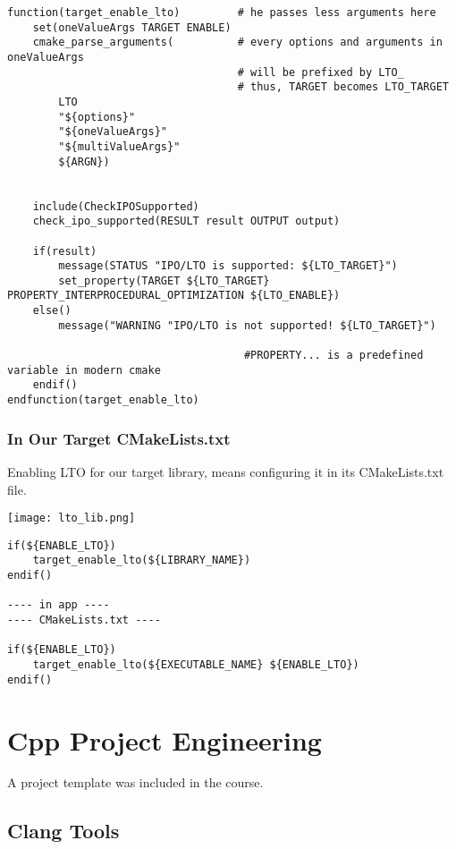 \begin{verbatim}
function(target_enable_lto)         # he passes less arguments here
    set(oneValueArgs TARGET ENABLE)
    cmake_parse_arguments(          # every options and arguments in oneValueArgs
                                    # will be prefixed by LTO_
                                    # thus, TARGET becomes LTO_TARGET
        LTO
        "${options}"
        "${oneValueArgs}"
        "${multiValueArgs}"
        ${ARGN})


    include(CheckIPOSupported)
    check_ipo_supported(RESULT result OUTPUT output)

    if(result) 
        message(STATUS "IPO/LTO is supported: ${LTO_TARGET}")
        set_property(TARGET ${LTO_TARGET} PROPERTY_INTERPROCEDURAL_OPTIMIZATION ${LTO_ENABLE})
    else()
        message("WARNING "IPO/LTO is not supported! ${LTO_TARGET}")

                                     #PROPERTY... is a predefined variable in modern cmake
    endif()
endfunction(target_enable_lto)
\end{verbatim}

\subsection{In Our Target CMakeLists.txt}

Enabling LTO for our target library, means configuring it in its CMakeLists.txt file.

\begin{center}
    \texttt{[image: lto\_lib.png]}
\end{center}


\begin{verbatim}
if(${ENABLE_LTO})
    target_enable_lto(${LIBRARY_NAME})
endif()

---- in app ----
---- CMakeLists.txt ----

if(${ENABLE_LTO})
    target_enable_lto(${EXECUTABLE_NAME} ${ENABLE_LTO})
endif()
\end{verbatim}

\chapter{Cpp Project Engineering}

A project template was included in the course. 


\section{Clang Tools}



